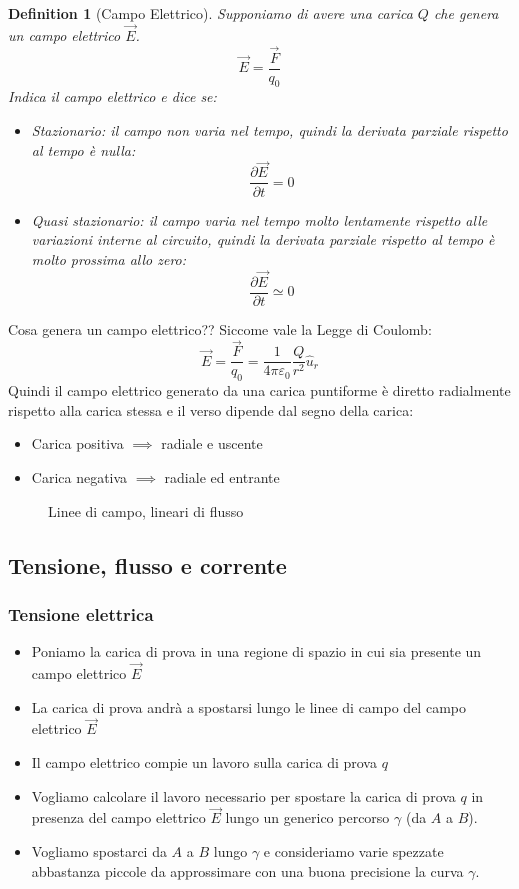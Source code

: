 \documentclass[12pt, a4paper]{article}
\newtheorem{definition}{Definition}[section]
\begin{document}
\begin{definition}[Campo Elettrico]
Supponiamo di avere una carica $Q$ che genera un campo elettrico $\vec{E}$.
\[
\vec{E} = \frac{\vec{F}}{q_0}
\]
Indica il campo elettrico e dice se:
\begin{itemize}
    \item Stazionario: il campo non varia nel tempo, quindi la derivata parziale rispetto al tempo è nulla:
    \[
    \frac{\partial \vec{E}}{\partial t} = 0
    \]
    \item Quasi stazionario: il campo varia nel tempo molto lentamente rispetto alle variazioni interne al circuito, quindi la derivata parziale rispetto al tempo è molto prossima allo zero:
    \[
    \frac{\partial \vec{E}}{\partial t} \simeq 0
    \]
\end{itemize}
\end{definition}

Cosa genera un campo elettrico??
Siccome vale la Legge di Coulomb:
\[
\vec{E} = \frac{\vec{F}}{q_0} = \frac{1}{4\pi\varepsilon_0} \frac{Q}{r^2} \hat{u}_r
\]
Quindi il campo elettrico generato da una carica puntiforme è diretto radialmente rispetto alla carica stessa e il verso dipende dal segno della carica:
\begin{itemize}
    \item Carica positiva $\implies$ radiale e uscente
    \item Carica negativa $\implies$ radiale ed entrante
\end{itemize}

\begin{figure}[h]
    \centering
    \caption{Linee di campo, lineari di flusso}
\end{figure}

\newpage

\subsection{Tensione, flusso e corrente}
\subsubsection{Tensione elettrica}
\begin{itemize}
    \item Poniamo la carica di prova in una regione di spazio in cui sia presente un campo elettrico $\vec{E}$
    \item La carica di prova andrà a spostarsi lungo le linee di campo del campo elettrico $\vec{E}$
    \item Il campo elettrico compie un lavoro sulla carica di prova $q$
    \item Vogliamo calcolare il lavoro necessario per spostare la carica di prova $q$ in presenza del campo elettrico $\vec{E}$ lungo un generico percorso $\gamma$ (da $A$ a $B$).
    \item Vogliamo spostarci da $A$ a $B$ lungo $\gamma$ e consideriamo varie spezzate abbastanza piccole da approssimare con una buona precisione la curva $\gamma$.
\end{itemize}
\end{document}
